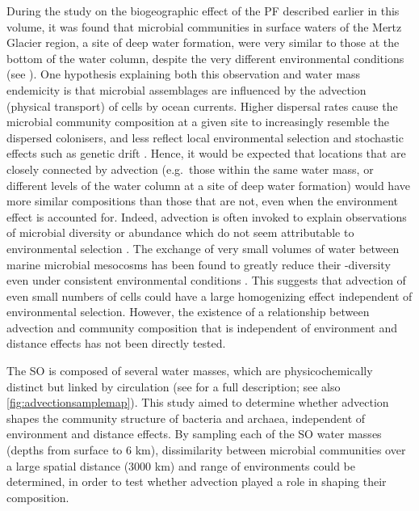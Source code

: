 During the study on the biogeographic effect of the \ac{PF} described earlier in this volume, it was found that microbial communities in surface waters of the Mertz Glacier region, a site of deep water formation, were very similar to those at the bottom of the water column, despite the very different environmental conditions (see ).
One hypothesis explaining both this observation and water mass endemicity is that microbial assemblages are influenced by the advection (physical transport) of cells by ocean currents. 
Higher dispersal rates cause the microbial community composition at a given site to increasingly resemble the dispersed colonisers, and less reflect local environmental selection and stochastic effects such as genetic drift \cite{Hanson:2012cb}.
Hence, it would be expected that locations that are closely connected by advection (e.g.\ those within the same water mass, or different levels of the water column at a site of deep water formation) would have more similar compositions than those that are not, even when the environment effect is accounted for.
Indeed, advection is often invoked to explain observations of microbial diversity or abundance which do not seem attributable to environmental selection \citep[e.g.][]{Sul:2013in, Ghiglione:2012ei, Giebel:2009hr, Lauro:2007bf}.
The exchange of very small volumes of water between marine microbial mesocosms has been found to greatly reduce their \textbeta-diversity even under consistent environmental conditions \cite{Declerck:2013cz}.
This suggests that advection of even small numbers of cells could have a large homogenizing effect independent of environmental selection.
However, the existence of a relationship between advection and community composition that is independent of environment and distance effects has not been directly tested.

The \ac{SO} is composed of several water masses, which are physicochemically distinct but linked by circulation (see  for a full description; see also \autoref{fig:advectionsamplemap}).
This study aimed to determine whether advection shapes the community structure of bacteria and archaea, independent of environment and distance effects.
By sampling each of the \ac{SO} water masses (depths from surface to \textapprox{}6 km), dissimilarity between microbial communities over a large spatial distance (\textapprox{}3000 km) and range of environments could be determined, in order to test whether advection played a role in shaping their composition.

